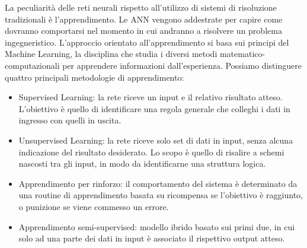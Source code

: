 \documentclass{article}
\begin{document}
La peculiarità delle reti neurali rispetto all'utilizzo di sistemi di risoluzione tradizionali è l'apprendimento. Le ANN vengono addestrate per capire come dovranno comportarsi nel momento in cui andranno a risolvere un problema ingegneristico. L'approccio orientato all'apprendimento si basa sui principi del Machine Learning, la disciplina che studia i diversi metodi matematico-computazionali per apprendere informazioni dall'esperienza. Possiamo distinguere quattro principali metodologie di apprendimento:

\begin{itemize}
\item Supervised Learning: la rete riceve un input e il relativo risultato atteso. L'obiettivo è quello di identificare una regola generale che colleghi i dati in ingresso con quelli in uscita.
\item Unsupervised Learning: la rete riceve solo set di dati in input, senza alcuna indicazione del risultato desiderato. Lo scopo è quello di risalire a schemi nascosti tra gli input, in modo da identificarne una struttura logica.
\item Apprendimento per rinforzo: il comportamento del sistema è determinato da una routine di apprendimento basata su ricompensa se l'obiettivo è raggiunto, o punizione se viene commesso un errore.
\item Apprendimento semi-supervised: modello ibrido basato sui primi due, in cui solo ad una parte dei dati in input è associato il rispettivo output atteso.
\end{itemize}
\end{document}
